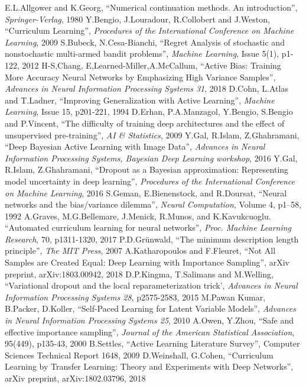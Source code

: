 \documentclass[a4paper,10pt]{article}
\begin{document}
\newpage

\begin{thebibliography}{1}
E.L.Allgower and K.Georg, ``Numerical continuation methods. An introduction'', \textit{Springer-Verlag}, 1980
Y.Bengio, J.Louradour, R.Collobert and J.Weston, ``Curriculum Learning'', \textit{Procedures of the International Conference on Machine Learning}, 2009
S.Bubeck, N.Cesa-Bianchi, ``Regret Analysis of stochastic and nonstochastic multi-armed bandit problems'', \textit{Machine Learning}, Issue 5(1), p1-122, 2012
H-S,Chang, E,Learned-Miller,A.McCallum, ``Active Bias: Training More Accuracy Neural Networks by Emphasizing High Variance Samples'', \textit{Advances in Neural Information Processing Systems 31}, 2018
D.Cohn, L.Atlas and T.Ladner, ``Improving Generalization with Active Learning'', \textit{Machine Learning}, Issue 15, p201-221, 1994
D.Erhan, P.A.Manzagol, Y.Bengio, S.Bengio and P.Vincent, ``The difficulty of training deep architectures and the effect of unsupervised pre-training'', \textit{AI \& Statistics}, 2009
Y.Gal, R.Islam, Z.Ghahramani, ``Deep Bayesian Active Learning with Image Data'', \textit{Advances in Neural Information Processing Systems, Bayesian Deep Learning workshop}, 2016
Y.Gal, R.Islam, Z.Ghahramani, ``Dropout as a Bayesian approximation: Representing model uncertainty in deep learning'', \textit{Procedures of the International Conference on Machine Learning}, 2016
S.Geman, E.Bienenstock, and R.Doursat, ``Neural networks and the bias/variance dilemma'', \textit{Neural Computation}, Volume 4, p1–58, 1992
A.Graves, M.G.Bellemare, J.Menick, R.Munos, and K.Kavukcuoglu. ``Automated curriculum learning for neural networks'', \textit{Proc. Machine Learning Research}, 70, p1311-1320, 2017
P.D.Gr{\"u}nwald, ``The minimum description length principle'', \textit{The MIT Press}, 2007
A.Katharopoulos and F.Fleuret, ``Not All Samples are Created Equal: Deep Learning with Importance Sampling'', arXiv preprint, arXiv:1803.00942, 2018
D.P.Kingma, T.Salimans and M.Welling, ``Variational dropout and the local reparameterization trick', \textit{Advances in Neural Information Processing Systems 28}, p2575-2583, 2015
M.Pawan Kumar, B.Packer, D.Koller, ``Self-Paced Learning for Latent Variable Models'', \textit{Advances in Neural Information Processing Systems 25}, 2010
A.Owen, Y.Zhou, ``Safe and effective importance sampling'', \textit{Journal of the American Statistical Association}, 95(449), p135-43, 2000
B.Settles, ``Active Learning Literature Survey'', Computer Sciences Technical Report 1648, 2009
D.Weinshall, G.Cohen, ``Curriculum Learning by Transfer Learning: Theory and Experiments with Deep Networks'', arXiv preprint, arXiv:1802.03796, 2018
\end{thebibliography}
\end{document}
